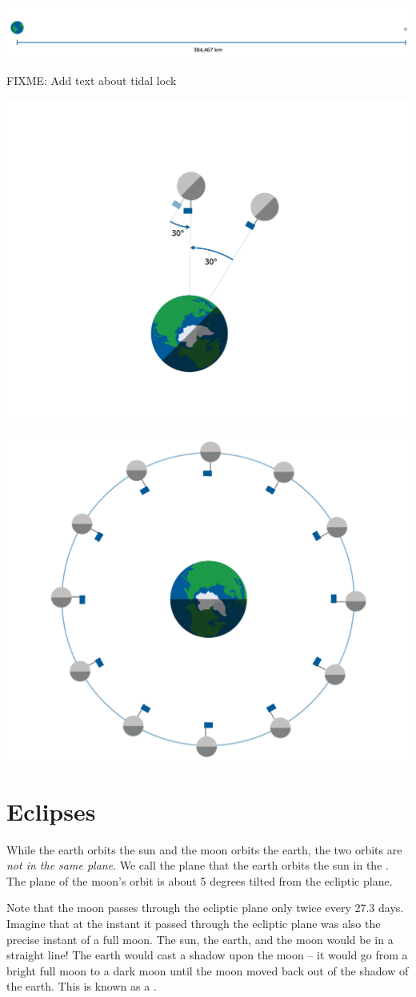 \includegraphics[width=.7\textwidth]{moonEarthScale.png}


FIXME: Add text about tidal lock


\includegraphics[width=.7\textwidth]{moonRotate.png}

\includegraphics[width=.7\textwidth]{moonCircleRotate.png}



\section{Eclipses}

While the earth orbits the sun and the moon orbits the earth,  the two orbits are \emph{not in the same plane}.
We call the plane that the earth orbits the sun in the .   The plane of the moon's orbit is about  5 degrees tilted from the ecliptic plane.

Note that the moon passes through the ecliptic plane only twice every 27.3 days.   Imagine that at the instant it passed through the ecliptic plane was also the precise instant of a full moon.    The sun, the earth, and the moon would be in a straight line!  The earth would cast a shadow upon the moon -- it would go from a bright full moon to a dark moon until the moon moved back out of the shadow of the earth.   This is known as a .

